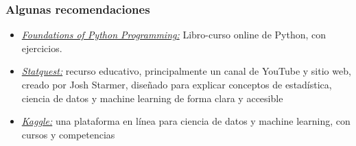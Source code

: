 \documentclass{beamer}
\begin{document}
\begin{frame}
\frametitle{Algunas recomendaciones}

\begin{itemize}

\item \href{https://runestone.academy/ns/books/published/fopp/index.html}{\alert{\textit{Foundations of Python Programming:}}} Libro-curso online de Python, con ejercicios.

\item \href{https://www.youtube.com/@statquest}{\alert{\textit{Statquest:}}} recurso educativo, principalmente un canal de YouTube y sitio web, creado por Josh Starmer, diseñado para explicar conceptos de estadística, ciencia de datos y machine learning de forma clara y accesible

\item \href{https://www.kaggle.com/}{\alert{\textit{Kaggle:}}} una plataforma en línea para ciencia de datos y machine learning, con cursos y competencias

\end{itemize}

\end{frame}



%
%
%
\end{document}
